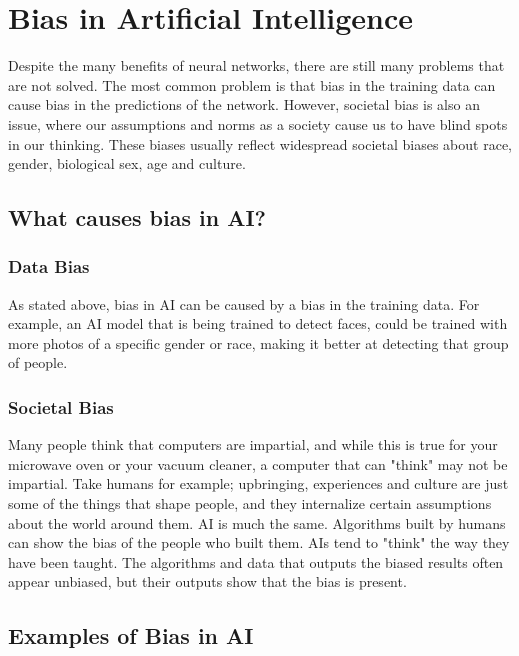 \documentclass[titlepage]{article}
\begin{document}
\section{Bias in Artificial Intelligence}
Despite the many benefits of neural networks, there are still many problems that are not solved. The most common problem is that bias in the training data can cause bias in the predictions of the network. However, societal bias is also an issue, where our assumptions and norms as a society cause us to have blind spots in our thinking. These biases usually reflect widespread societal biases about race, gender, biological sex, age and culture. \cite{Bias in Artificial Intelligence}
\subsection{What causes bias in AI?}
\subsubsection{Data Bias}
As stated above, bias in AI can be caused by a bias in the training data. For example, an AI model that is being trained to detect faces, could be trained with more photos of a specific gender or race, making it better at detecting that group of people.

\subsubsection{Societal Bias}
Many people think that computers are impartial, and while this is true for your microwave oven or your vacuum cleaner, a computer that can "think" may not be impartial. Take humans for example; upbringing, experiences and culture are just some of the things that shape people, and they internalize certain assumptions about the world around them. AI is much the same. Algorithms built by humans can show the bias of the people who built them. AIs tend to "think" the way they have been taught. The algorithms and data that outputs the biased results often appear unbiased, but their outputs show that the bias is present. 

\subsection{Examples of Bias in AI}
\end{document}
